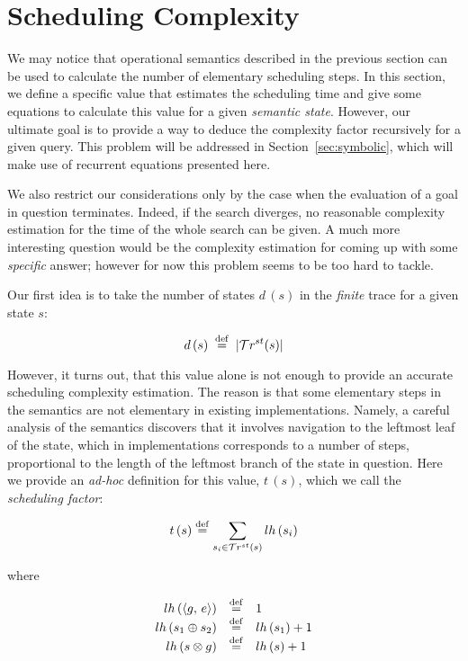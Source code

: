 \section{Scheduling Complexity}
\label{sec:scheduling}

We may notice that operational semantics described in the previous section can be used to calculate the number of elementary scheduling steps.
In this section, we define a specific value that estimates the scheduling time and give some equations to calculate this value for a given \emph{semantic
state}. However, our ultimate goal is to provide a way to deduce the complexity factor recursively for a given query. This problem will be addressed in
Section~\ref{sec:symbolic}, which will make use of recurrent equations presented here.

We also restrict our considerations only by the case when the evaluation of a goal in question terminates. Indeed,
if the search diverges, no reasonable complexity estimation for the time of the whole search can be given. A much more interesting question would be
the complexity estimation for coming up with some \emph{specific} answer; however for now this problem seems to be too hard to
tackle.

Our first idea is to take the number of states $d\,(s)$ in the \emph{finite} trace for a given state $s$:

\[ d\,(s) \; \overset{\mathrm{def}}{=} \; | \mathcal{T}r^{st}(s) |  \]

However, it turns out, that this value alone is not enough to provide an accurate scheduling complexity estimation. The reason is that some
elementary steps in the semantics are not elementary in existing implementations. Namely, a careful analysis of the semantics discovers that
it involves navigation to the leftmost leaf of the state, which in implementations corresponds to a number of
steps, proportional to the length of the leftmost branch of the state in question. Here we provide an \emph{ad-hoc} definition for this value, $t\,(s)$, which we call the
\emph{scheduling factor}:

\[
t\,(s) \overset{\mathrm{def}}{=} \sum\limits_{s_i \in \mathcal{T}r^{st}(s)} lh\,(s_i) 
\]

where

\[
\begin{array}{rcl}
 lh\,(\langle g ,\, e \rangle)  &\overset{\mathrm{def}}{=}& 1 \\
 lh\,(s_1 \oplus s_2) &\overset{\mathrm{def}}{=}& lh\,(s_1) + 1 \\
 lh\,(s \otimes g)    &\overset{\mathrm{def}}{=}& lh\,(s) + 1 \\
\end{array}
\]


